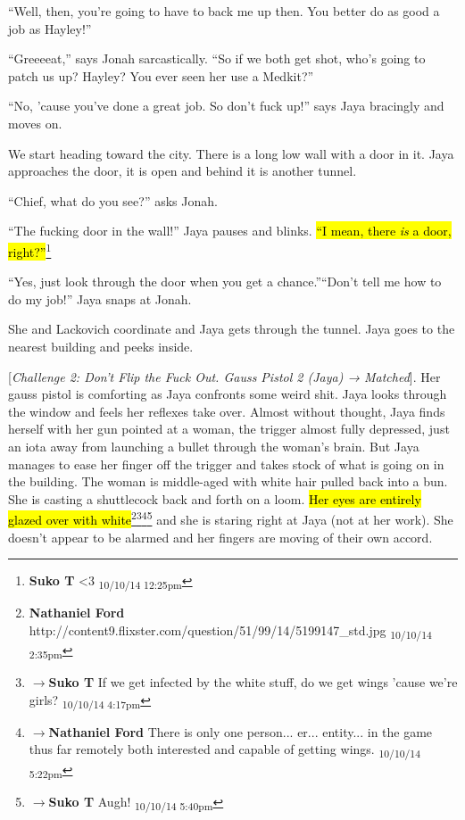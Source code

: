 ``Well, then, you're going to have to back me up then.  You better do as good a job as Hayley!''

``Greeeeat,'' says Jonah sarcastically.  ``So if we both get shot, who's going to patch us up?  Hayley?  You ever seen her use a Medkit?''

``No, 'cause you've done a great job.  So don't fuck up!'' says Jaya bracingly and moves on.





We start heading toward the city.  There is a long low wall with a door in it.  Jaya approaches the door, it is open and behind it is another tunnel.

``Chief, what do you see?'' asks Jonah.

``The fucking door in the wall!'' Jaya pauses and blinks.  \hl{``I mean, there \textit{is} a door, right?''}\footnote{\textbf{Suko T }\textless 3 \textsubscript{10/10/14 12:25pm}}

``Yes, just look through the door when you get a chance.''``Don't tell me how to do my job!'' Jaya snaps at Jonah.  

She and Lackovich coordinate and Jaya gets through the tunnel.  Jaya goes to the nearest building and peeks inside.

{[}\textit{Challenge 2: Don't Flip the Fuck Out.  Gauss Pistol 2 (Jaya) → Matched}{]}.   Her gauss pistol is comforting as Jaya confronts some weird shit.  Jaya looks through the window and feels her reflexes take over.  Almost without thought, Jaya finds herself with her gun pointed at a woman, the trigger almost fully depressed, just an iota away from launching a bullet through the woman's brain.  But Jaya manages to ease her finger off the trigger and takes stock of what is going on in the building.  The woman is middle-aged with white hair pulled back into a bun.  She is casting a shuttlecock back and forth on a loom.  \hl{Her eyes are entirely glazed over with white}\footnote{\textbf{Nathaniel Ford }http://content9.flixster.com/question/51/99/14/5199147\_std.jpg \textsubscript{10/10/14 2:35pm}}\footnote{$\rightarrow$\textbf{Suko T }If we get infected by the white stuff, do we get wings 'cause we're girls? \textsubscript{10/10/14 4:17pm}}\footnote{$\rightarrow$\textbf{Nathaniel Ford }There is only one person... er... entity... in the game thus far remotely both interested and capable of getting wings. \textsubscript{10/10/14 5:22pm}}\footnote{$\rightarrow$\textbf{Suko T }Augh!  \textsubscript{10/10/14 5:40pm}} and she is staring right at Jaya (not at her work).  She doesn't appear to be alarmed and her fingers are moving of their own accord.



